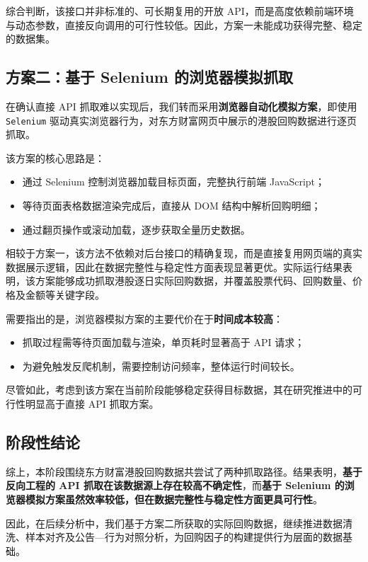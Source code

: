 \documentclass[a4paper,10pt]{article}
\begin{document}
综合判断，该接口并非标准的、可长期复用的开放 API，而是高度依赖前端环境与动态参数，直接反向调用的可行性较低。因此，方案一未能成功获得完整、稳定的数据集。

\subsection{方案二：基于 Selenium 的浏览器模拟抓取}

在确认直接 API 抓取难以实现后，我们转而采用\textbf{浏览器自动化模拟方案}，即使用 \texttt{Selenium} 驱动真实浏览器行为，对东方财富网页中展示的港股回购数据进行逐页抓取。

该方案的核心思路是：
\begin{itemize}
    \item 通过 Selenium 控制浏览器加载目标页面，完整执行前端 JavaScript；
    \item 等待页面表格数据渲染完成后，直接从 DOM 结构中解析回购明细；
    \item 通过翻页操作或滚动加载，逐步获取全量历史数据。
\end{itemize}

相较于方案一，该方法不依赖对后台接口的精确复现，而是直接复用网页端的真实数据展示逻辑，因此在数据完整性与稳定性方面表现显著更优。实际运行结果表明，该方案能够成功抓取港股逐日实际回购数据，并覆盖股票代码、回购数量、价格及金额等关键字段。

需要指出的是，浏览器模拟方案的主要代价在于\textbf{时间成本较高}：
\begin{itemize}
    \item 抓取过程需等待页面加载与渲染，单页耗时显著高于 API 请求；
    \item 为避免触发反爬机制，需要控制访问频率，整体运行时间较长。
\end{itemize}

尽管如此，考虑到该方案在当前阶段能够稳定获得目标数据，其在研究推进中的可行性明显高于直接 API 抓取方案。

\subsection{阶段性结论}

综上，本阶段围绕东方财富港股回购数据共尝试了两种抓取路径。结果表明，\textbf{基于反向工程的 API 抓取在该数据源上存在较高不确定性}，而\textbf{基于 Selenium 的浏览器模拟方案虽然效率较低，但在数据完整性与稳定性方面更具可行性}。

因此，在后续分析中，我们基于方案二所获取的实际回购数据，继续推进数据清洗、样本对齐及公告—行为对照分析，为回购因子的构建提供行为层面的数据基础。
\end{document}

